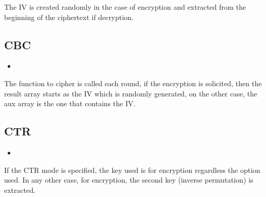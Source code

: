 \documentclass[titlepage, 12pt]{article}
\numberwithin{equation}{section}%
\numberwithin{figure}{section}%
\numberwithin{table}{section}%
\newcommand{\delimitCodeScript}[6][]{
	\begin{itemize}
		\item[]
	\end{itemize}	
}
\begin{document}
		The IV is created randomly in the case of encryption and extracted from the beginning of the ciphertext if decryption.
		\subsection{CBC}
		\delimitCodeScript{cpp}{Functions}{CBC operation mode}{93}{106}
		The function to cipher is called each round, if the encryption is solicited, then the result array starts as the IV which is randomly generated, on the other case, the aux array is the one that contains the IV.
		\subsection{CTR}
		\delimitCodeScript{cpp}{Functions}{CTR operation mode}{108}{113}
		If the CTR mode is specified, the key used is for encryption regardless the option used. In any other case, for encryption, the second key (inverse permutation) is extracted.
	
	
\end{document}
